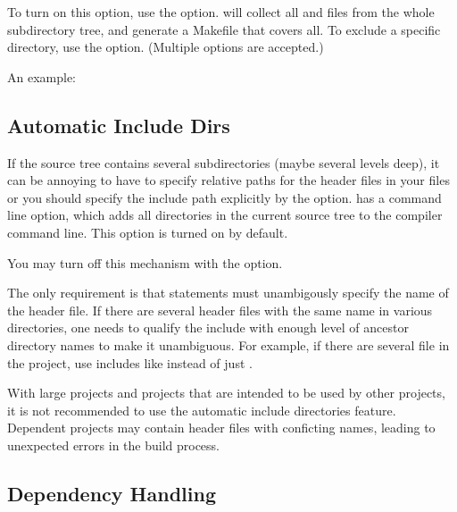 To turn on this option, use the  option.
 will collect all  and  files from
the whole subdirectory tree, and generate a Makefile that covers all.
To exclude a specific directory, use the 
option. (Multiple  options are accepted.)

An example:



\subsection{Automatic Include Dirs}
\label{sec:build-sim-progs:automatic-include-dirs}

If the source tree contains several subdirectories (maybe several levels
deep), it can be annoying to have to specify relative paths for the header
files in your  files or you should specify the include path
explicitly by the  option.  has a
command line option, which adds all directories in the current source tree
to the compiler command line. This option is turned on by default.

\begin{note}
You may turn off this mechanism with the  option.
\end{note}

The only requirement is that  statements must unambigously
specify the name of the header file. If there are several header files with
the same name in various directories, one needs to qualify the include with
enough level of ancestor directory names to make it unambiguous. For example,
if there are several  file in the project, use includes like
 instead of just .

\begin{note}
With large projects and projects that are intended to be used by other
projects, it is not recommended to use the automatic include directories
feature. Dependent projects may contain header files with conficting names,
leading to unexpected errors in the build process.
\end{note}


\subsection{Dependency Handling}
\label{sec:build-sim-progs:dependency-handling}

